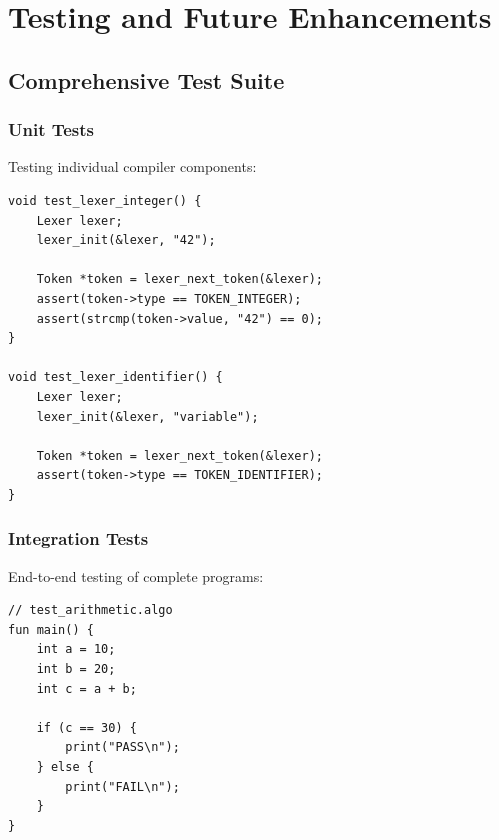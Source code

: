 \documentclass[12pt,a4paper,oneside]{book}
\begin{document}
\part{Testing and Future Enhancements}

\chapter{Comprehensive Test Suite}

\section{Unit Tests}

Testing individual compiler components:

\begin{lstlisting}[style=c, caption={Lexer Tests}]
void test_lexer_integer() {
    Lexer lexer;
    lexer_init(&lexer, "42");
    
    Token *token = lexer_next_token(&lexer);
    assert(token->type == TOKEN_INTEGER);
    assert(strcmp(token->value, "42") == 0);
}

void test_lexer_identifier() {
    Lexer lexer;
    lexer_init(&lexer, "variable");
    
    Token *token = lexer_next_token(&lexer);
    assert(token->type == TOKEN_IDENTIFIER);
}
\end{lstlisting}

\section{Integration Tests}

End-to-end testing of complete programs:

\begin{lstlisting}[style=algo, caption={Test Program}]
// test_arithmetic.algo
fun main() {
    int a = 10;
    int b = 20;
    int c = a + b;
    
    if (c == 30) {
        print("PASS\n");
    } else {
        print("FAIL\n");
    }
}
\end{lstlisting}

\end{document}
